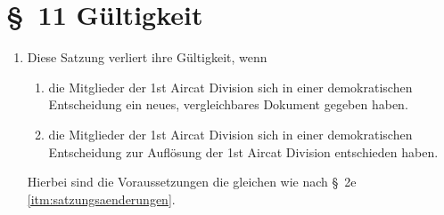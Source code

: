 \section*{\S~11 Gültigkeit}
\label{sec:gueltigkeit}

\begin{enumerate}[label=(\arabic*)]
    \item Diese Satzung verliert ihre Gültigkeit, wenn
    \begin{enumerate}[label=(\Alph*)]
        \item die Mitglieder der 1st Aircat Division sich in einer demokratischen Entscheidung ein neues, vergleichbares Dokument gegeben haben.
        \item die Mitglieder der 1st Aircat Division sich in einer demokratischen Entscheidung zur Auflösung der 1st Aircat Division entschieden haben.
    \end{enumerate}
    Hierbei sind die Voraussetzungen die gleichen wie nach \S~2e \ref{itm:satzungsaenderungen}.
\end{enumerate}
